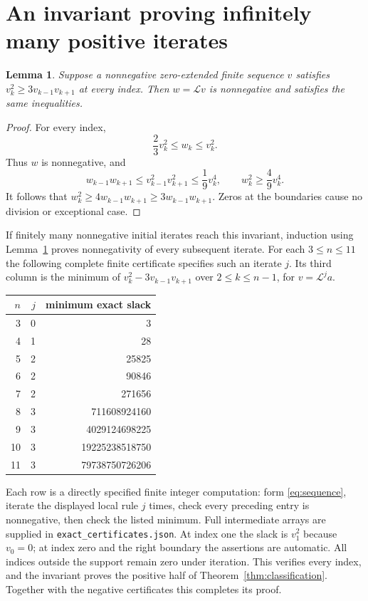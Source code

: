 \documentclass[11pt]{article}
\newtheorem{lemma}[theorem]{Lemma}
\begin{document}
\section{An invariant proving infinitely many positive iterates}
\begin{lemma}\label{lem:invariant}
Suppose a nonnegative zero-extended finite sequence $v$ satisfies
$v_k^2\ge3v_{k-1}v_{k+1}$ at every index. Then $w=\mathcal Lv$ is
nonnegative and satisfies the same inequalities.
\end{lemma}
\begin{proof}
For every index,
\[
 \frac23v_k^2\le w_k\le v_k^2.
\]
Thus $w$ is nonnegative, and
\[
 w_{k-1}w_{k+1}\le v_{k-1}^2v_{k+1}^2\le\frac19v_k^4,
 \qquad w_k^2\ge\frac49v_k^4.
\]
It follows that $w_k^2\ge4w_{k-1}w_{k+1}\ge3w_{k-1}w_{k+1}$.
Zeros at the boundaries cause no division or exceptional case.
\end{proof}
If finitely many nonnegative initial iterates reach this invariant, induction
using Lemma~\ref{lem:invariant} proves nonnegativity of every subsequent
iterate. For each $3\le n\le11$ the following complete finite certificate
specifies such an iterate $j$. Its third column is the minimum of
$v_k^2-3v_{k-1}v_{k+1}$ over $2\le k\le n-1$, for $v=\mathcal L^j a$.
\begin{center}
\begin{tabular}{rrr}
\toprule
$n$ & $j$ & minimum exact slack\\\midrule
3&0&3\\4&1&28\\5&2&25825\\6&2&90846\\7&2&271656\\
8&3&711608924160\\9&3&4029124698225\\
10&3&19225238518750\\11&3&79738750726206\\\bottomrule
\end{tabular}
\end{center}
Each row is a directly specified finite integer computation: form
\eqref{eq:sequence}, iterate the displayed local rule $j$ times, check every
preceding entry is nonnegative, then check the listed minimum. Full
intermediate arrays are supplied in \texttt{exact\_certificates.json}.
At index one the slack is $v_1^2$ because $v_0=0$; at index zero and the
right boundary the assertions are automatic. All indices outside the
support remain zero under iteration. This verifies every index, and the
invariant proves the positive half of Theorem~\ref{thm:classification}.
Together with the negative certificates this completes its proof.
\end{document}
